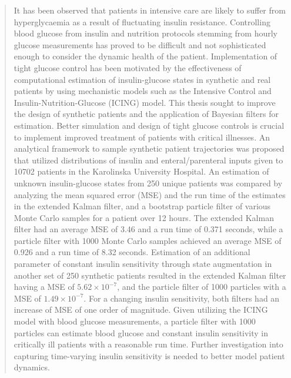 \documentclass[nomenclature, english, bibtex]{kththesis}
\begin{document}
\begin{abstract}
\begin{scontents}[store-env=abstracts,print-env=true]
It has been observed that patients in intensive care are likely to suffer from hyperglycaemia as a result of fluctuating insulin resistance. Controlling blood glucose from insulin and nutrition protocols stemming from hourly glucose measurements has proved to be difficult and not sophisticated enough to consider the dynamic health of the patient. Implementation of tight glucose control has been motivated by the effectiveness of computational estimation of insulin-glucose states in synthetic and real patients by using mechanistic models such as the Intensive Control and Insulin-Nutrition-Glucose (\gls{ICING}) model. This thesis sought to improve the design of synthetic patients and the application of Bayesian filters for estimation. Better simulation and design of tight glucose controls is crucial to implement improved treatment of patients with critical illnesses. An analytical framework to sample synthetic patient trajectories was proposed that utilized distributions of insulin and enteral/parenteral inputs given to 10702 patients in the Karolinska University Hospital. An estimation of unknown insulin-glucose states from 250 unique patients was compared by analyzing the mean squared error (\gls{MSE}) and the run time of the estimates in the extended Kalman filter, and a bootstrap particle filter of various Monte Carlo samples for a patient over 12 hours. The extended Kalman filter had an average \gls{MSE} of 3.46 and a run time of 0.371 seconds, while a particle filter with 1000 Monte Carlo samples achieved an average \gls{MSE} of 0.926 and a run time of 8.32 seconds. Estimation of an additional parameter of constant insulin sensitivity through state augmentation in another set of 250 synthetic patients resulted in the extended Kalman filter having a \gls{MSE} of $5.62 \times 10^{-7}$, and the particle filter of 1000 particles with a \gls{MSE} of $1.49 \times 10^{-7}.$ For a changing insulin sensitivity, both filters had an increase of \gls{MSE} of one order of magnitude. Given utilizing the \gls{ICING} model with blood glucose measurements, a particle filter with 1000 particles can estimate blood glucose and constant insulin sensitivity in critically ill patients with a reasonable run time. Further investigation into capturing time-varying insulin sensitivity is needed to better model patient dynamics.


\end{scontents}
\end{abstract}
\end{document}
